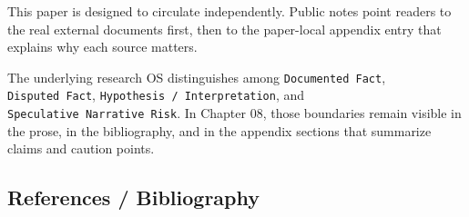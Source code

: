 \documentclass[
  american,
  11pt,
  letterpaper,
]{article}
\begin{document}
This paper is designed to circulate independently. Public notes point
readers to the real external documents first, then to the paper-local
appendix entry that explains why each source matters.

The underlying research OS distinguishes among
\texttt{Documented\ Fact}, \texttt{Disputed\ Fact},
\texttt{Hypothesis\ /\ Interpretation}, and
\texttt{Speculative\ Narrative\ Risk}. In Chapter 08, those boundaries
remain visible in the prose, in the bibliography, and in the appendix
sections that summarize claims and caution points.

\subsection{References / Bibliography}\label{references-bibliography-8}
\end{document}

